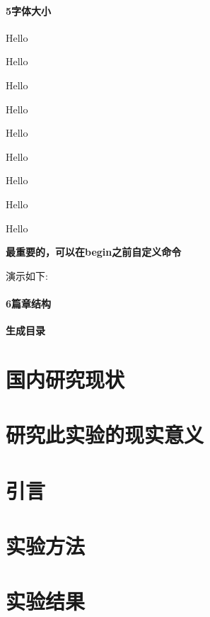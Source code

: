 \documentclass[fontset=windows]{article}
\begin{document}
    \paragraph{5字体大小}

    {\tiny Hello}

    {\scriptsize Hello}

    {\footnotesize Hello}

    {\small Hello}

    {\normalsize Hello}

    {\large Hello}

    {\LARGE Hello}

    {\huge Hello}

    {\Huge Hello}

    \textbf{最重要的，可以在begin之前自定义命令}

    演示如下:

    \paragraph{6篇章结构}
    \textbf{生成目录}

    \section{国内研究现状}
    \section{研究此实验的现实意义}
    \section{引言}
    \section{实验方法}
    \section{实验结果}
\end{document}
